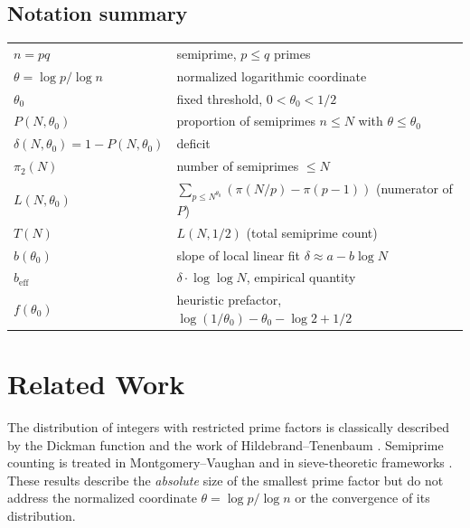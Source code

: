 \documentclass[11pt]{article}
\theoremstyle{definition}
\begin{document}
\subsection*{Notation summary}
\begin{center}
\begin{tabular}{ll}
\(n = pq\) & semiprime, \(p\le q\) primes \\
\(\theta = \log p / \log n\) & normalized logarithmic coordinate \\
\(\theta_0\) & fixed threshold, \(0<\theta_0<1/2\) \\
\(P(N,\theta_0)\) & proportion of semiprimes \(n\le N\) with \(\theta\le\theta_0\) \\
\(\delta(N,\theta_0)=1-P(N,\theta_0)\) & deficit \\
\(\pi_2(N)\) & number of semiprimes \(\le N\) \\
\(L(N,\theta_0)\) & \(\sum_{p\le N^{\theta_0}} (\pi(N/p)-\pi(p-1))\) (numerator of \(P\)) \\
\(T(N)\) & \(L(N,1/2)\) (total semiprime count) \\
\(b(\theta_0)\) & slope of local linear fit \(\delta \approx a - b\log N\) \\
\(b_{\mathrm{eff}}\) & \(\delta\cdot\log\log N\), empirical quantity \\
\(f(\theta_0)\) & heuristic prefactor, \(\log(1/\theta_0)-\theta_0-\log2+1/2\) \\
\end{tabular}
\end{center}


\section{Related Work}

The distribution of integers with restricted prime factors is classically described by
the Dickman function \cite{dickman1930} and the work of Hildebrand--Tenenbaum
\cite{hildebrand1993}.  Semiprime counting is treated in Montgomery--Vaughan
\cite{montgomery2007} and in sieve-theoretic frameworks
\cite{halberstam1974, tenenbaum1995}.  These results describe the \emph{absolute}
size of the smallest prime factor but do not address the normalized coordinate
\(\theta = \log p / \log n\) or the convergence of its distribution.
\end{document}
